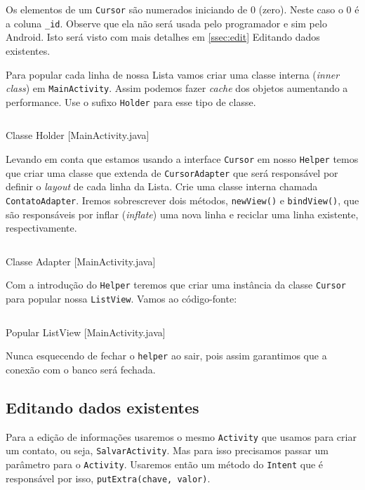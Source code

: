 Os elementos de um \texttt{Cursor} são numerados iniciando de 0 (zero).
Neste caso o 0 é a coluna \texttt{\_id}. Observe que ela não será usada
pelo programador e sim pelo Android. Isto será visto com mais detalhes
em \ref{ssec:edit} Editando dados existentes.

Para popular cada linha de nossa Lista vamos criar uma classe interna
(\emph{inner class}) em \texttt{MainActivity}. Assim podemos fazer
\emph{cache} dos objetos aumentando a performance. Use o sufixo
\texttt{Holder} para esse tipo de classe.

\begin{listing}[H]
  \inputminted[linenos=true,frame=bottomline,tabsize=3]{ java }{ source/MainActivity-4.java }
  \caption{Classe Holder [MainActivity.java]}
\end{listing}

Levando em conta que estamos usando a interface \texttt{Cursor} em nosso
\texttt{Helper} temos que criar uma classe que extenda de
\texttt{CursorAdapter} que será responsável por definir o \emph{layout}
de cada linha da Lista. Crie uma classe interna chamada
\texttt{ContatoAdapter}. Iremos sobrescrever dois métodos,
\texttt{newView()} e \texttt{bindView()}, que são responsáveis por
inflar (\emph{inflate}) uma nova linha e reciclar uma linha existente,
respectivamente.

\begin{listing}[H]
  \inputminted[linenos=true,frame=bottomline,tabsize=3]{ java }{ source/MainActivity-5.java }
  \caption{Classe Adapter [MainActivity.java]}
\end{listing}

Com a introdução do \texttt{Helper} teremos que criar uma instância da
classe \texttt{Cursor} para popular nossa \texttt{ListView}. Vamos ao
código-fonte:

\begin{listing}[H]
  \inputminted[linenos=true,frame=bottomline,tabsize=3]{ java }{ source/MainActivity-6.java }
  \caption{Popular ListView [MainActivity.java]}
\end{listing}

Nunca esquecendo de fechar o \texttt{helper} ao sair, pois assim
garantimos que a conexão com o banco será fechada.

\subsection{Editando dados existentes \label{ssec:edit}}

Para a edição de informações usaremos o mesmo \texttt{Activity} que
usamos para criar um contato, ou seja, \texttt{SalvarActivity}. Mas para
isso precisamos passar um parâmetro para o \texttt{Activity}. Usaremos
então um método do \texttt{Intent} que é responsável por isso,
\texttt{putExtra(chave, valor)}.

